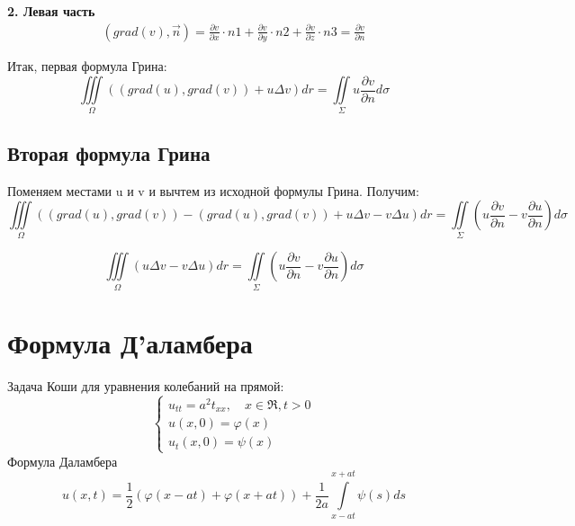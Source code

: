 \documentclass[11pt,a4paper]{article}
\begin{document}
\textbf{2. Левая часть} \\
\begin{equation}
\begin{split}
(grad(v), \vec{n}) = \frac{\partial v}{\partial x} \cdot n1 + \frac{\partial v}{\partial y} \cdot n2 + \frac{\partial v}{\partial z} \cdot n3 = \frac{\partial v}{\partial n}
\end{split}
\end{equation}

Итак, первая формула Грина:
$$
\iiint \limits_{\varOmega} ((grad(u), grad(v)) + u\Delta v)dr = \iint \limits_{\Sigma} u  \frac{\partial v}{\partial n} d\sigma
$$

\subsection{Вторая формула Грина}
Поменяем местами u и v и вычтем из исходной формулы Грина. Получим:
$$
\iiint \limits_{\varOmega} ((grad(u), grad(v)) - (grad(u), grad(v)) + u\Delta v -  v\Delta u)dr = \iint \limits_{\Sigma} (u  \frac{\partial v}{\partial n} -  v  \frac{\partial u}{\partial n}) d\sigma
$$

$$
\iiint \limits_{\varOmega} (u\Delta v -  v\Delta u)dr = \iint \limits_{\Sigma} (u\frac{\partial v}{\partial n} -  v  \frac{\partial u}{\partial n}) d\sigma
$$

\section{Формула Д'аламбера}
Задача Коши для уравнения колебаний на прямой:
$$
\begin{cases}
	u_{tt} = a^2t_{xx}, \quad x \in \Re, t > 0\\
	u(x,0) = \varphi(x) \\
	u_t(x,0) = \psi(x)
\end{cases}
$$
Формула Даламбера
$$
u(x,t) = \frac{1}{2}(\varphi(x-at) + \varphi(x+at)) + \frac{1}{2a} \int\limits_{x-at}^{x+at} \psi(s)ds
$$
\end{document}
